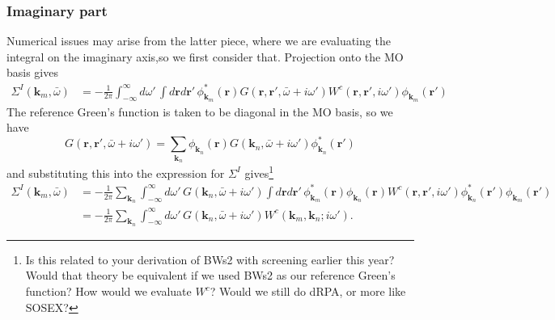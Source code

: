 \subsubsection{Imaginary part}
Numerical issues may arise from the latter piece, where we are evaluating the integral on the imaginary axis,so we first consider that. Projection onto the MO basis gives 
\begin{align}
    \Sigma^I(\mathbf{k}_m,\bar{\omega}) &=
-\frac{1}{2\pi}
\int_{-\infty}^{\infty}
d\omega'\,
\int d\mathbf{r} d\mathbf{r}'\,
\phi_{\mathbf{k}_m}^*(\mathbf{r})
G\left(\mathbf{r},\mathbf{r}',\bar{\omega}+i\omega'\right)
W^c\left(\mathbf{r},\mathbf{r}',i\omega'\right)
\phi_{\mathbf{k}_m}(\mathbf{r}')
\end{align}
The reference Green's function is taken to be diagonal in the MO basis, so we have
\begin{equation}
    G\left(\mathbf{r},\mathbf{r}',\bar{\omega}+i\omega'\right) = \sum_{\bm{k}_n} \phi_{\mathbf{k}_n}(\mathbf{r}) G\left(\mathbf{k}_n,\bar{\omega}+i\omega'\right) \phi_{\mathbf{k}_n}^*(\mathbf{r}')
\end{equation}
and substituting this into the expression for \(\Sigma^I\) gives\footnote{Is this related to your derivation of BWs2 with screening earlier this year? Would that theory be equivalent if we used BWs2 as our reference Green's function? How would we evaluate $W^c$? Would we still do dRPA, or more like SOSEX? }
\begin{align}
\Sigma^I(\mathbf{k}_m,\bar{\omega})&=
-\frac{1}{2\pi}
\sum_{\mathbf{k}_n}
\int_{-\infty}^{\infty}
d\omega'\,
G\left(\mathbf{k}_n,\bar{\omega}+i\omega'\right)
\int d\mathbf{r} d\mathbf{r}'\,
\phi_{\mathbf{k}_m}^*(\mathbf{r})
\phi_{\mathbf{k}_n}(\mathbf{r})
W^c\left(\mathbf{r},\mathbf{r}',i\omega'\right)
\phi_{\mathbf{k}_n}^*(\mathbf{r}')
\phi_{\mathbf{k}_m}(\mathbf{r}') \\
&= -\frac{1}{2\pi}
\sum_{\mathbf{k}_n}
\int_{-\infty}^{\infty}
d\omega'\,
G\left(\mathbf{k}_n,\bar{\omega}+i\omega'\right)
W^c\left(\mathbf{k}_m,\mathbf{k}_n;i\omega'\right).
\end{align}
